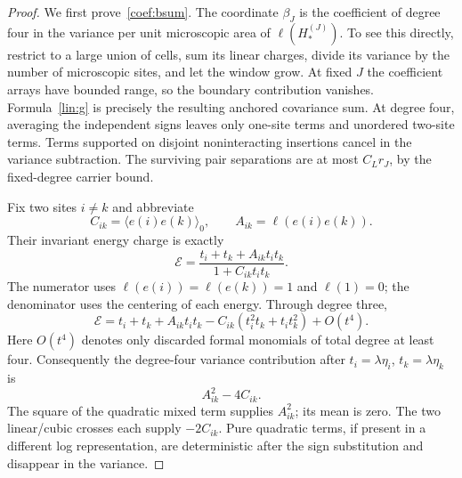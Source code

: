 \begin{proof}
We first prove~\eqref{coef:bsum}.  The coordinate $\beta_J$ is the
coefficient of degree four in the variance per unit microscopic area of
$\ell(H_*^{(J)})$.  To see this directly, restrict to a large union of cells,
sum its linear charges, divide its variance by the number of microscopic
sites, and let the window grow.  At fixed $J$ the coefficient arrays have
bounded range, so the boundary contribution vanishes.  Formula~\eqref{lin:g}
is precisely the resulting anchored covariance sum.  At degree four,
averaging the independent signs leaves only one-site terms and unordered
two-site terms.  Terms supported on disjoint noninteracting insertions
cancel in the variance subtraction.  The surviving pair separations are
at most $C_Lr_J$, by the fixed-degree carrier bound.

Fix two sites $i\ne k$ and abbreviate
\[
 C_{ik}=\langle e(i)e(k)\rangle_0,\qquad
 A_{ik}=\ell(e(i)e(k)).
\]
Their invariant energy charge is exactly
\begin{equation}\label{coef:pair-rational}
 \mathcal E=
 \frac{t_i+t_k+A_{ik}t_it_k}{1+C_{ik}t_it_k}.
\end{equation}
The numerator uses $\ell(e(i))=\ell(e(k))=1$ and $\ell(1)=0$;
the denominator uses the centering of each energy.  Through degree three,
\begin{equation}\label{coef:pair-expansion}
 \mathcal E=t_i+t_k+A_{ik}t_it_k
              -C_{ik}(t_i^2t_k+t_it_k^2)+O(t^4).
\end{equation}
Here $O(t^4)$ denotes only discarded formal monomials of total degree at
least four.  Consequently the degree-four variance contribution after
$t_i=\lambda\eta_i$, $t_k=\lambda\eta_k$ is
\begin{equation}\label{coef:pair-value}
 A_{ik}^2-4C_{ik}.
\end{equation}
The square of the quadratic mixed term supplies $A_{ik}^2$; its mean is
zero.  The two linear/cubic crosses each supply $-2C_{ik}$.
Pure quadratic terms, if present in a different log representation, are
deterministic after the sign substitution and disappear in the variance.


\end{proof}
